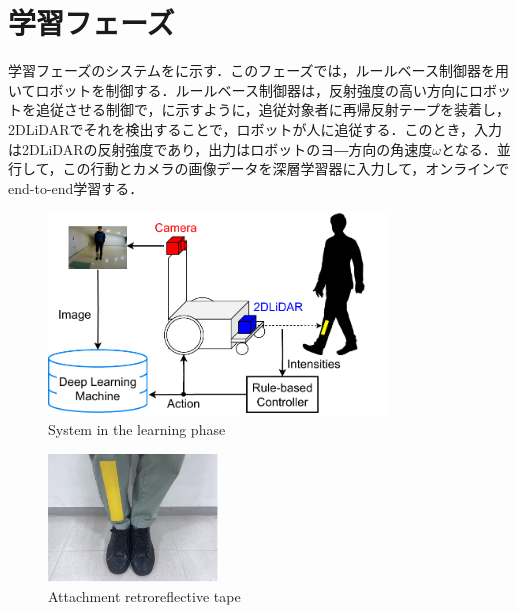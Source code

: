 
\section{学習フェーズ}

  学習フェーズのシステムをに示す．このフェーズでは，ルールベース制御器を用いてロボットを制御する．ルールベース制御器は，反射強度の高い方向にロボットを追従させる制御で，に示すように，追従対象者に再帰反射テープを装着し，2DLiDARでそれを検出することで，ロボットが人に追従する．このとき，入力は2DLiDARの反射強度であり，出力はロボットのヨ―方向の角速度$\omega$となる．並行して，この行動とカメラの画像データを深層学習器に入力して，オンラインでend-to-end学習する．

  \begin{figure}[h]
    \centering
    \includegraphics[width=9cm] {images/pdf/RobotGuidance_learning_system}
    \captionsetup{justification=raggedright} %
    \caption{System in the learning phase}
    \label{Fig:RobotGuidance_learning_system}
  \end{figure}

  \begin{figure}[h]
    \centering
    \includegraphics[width=4.5cm] {images/pdf/RobotGuidance_learning_phase_leg}
    \captionsetup{justification=raggedright} %
    \caption{Attachment retroreflective tape}
    \label{Fig:RobotGuidance_learning_phase_leg}
  \end{figure}

\newpage
